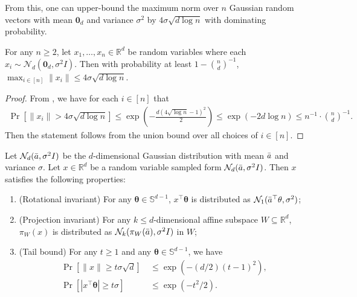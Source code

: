 \documentclass{theoretics}
\newcommand{\R}{\mathbb R}
\newcommand{\E}{\mathbb E}
\begin{document}
From this, one can upper-bound the maximum norm over $n$ Gaussian random vectors with mean $\mathbf{0}_d$ and variance $\sigma^2$ by $4\sigma \sqrt{d \log n}$ with dominating probability.
\begin{corollary}\label{cor:gaussian-globaldiam}
    For any $n \geq 2$,
    let $x_1, \ldots, x_n \in \R^d$ be random variables where each $x_i \sim \mathcal{N}_d(\mathbf{0}_d, \sigma^2 I)$. Then with probability at least $1 - \binom{n}{d}^{-1}$, $\max_{i \in [n]}\|x_i\| \leq 4 \sigma \sqrt{d\log n}$.
\end{corollary}
\begin{proof}
    From , we have for each $i \in [n]$ that
    \begin{align*}
        \Pr[\|x_i\| > 4\sigma \sqrt{d\log n}] \leq \exp(-\frac{d(4\sqrt{\log n} - 1)^2}{2}) \leq \exp(-2d\log n) \leq n^{-1} \cdot \binom{n}{d}^{-1}.
    \end{align*}    
    Then the statement follows from the union bound over all choices of $i \in [n]$.
\end{proof}


\iffalse
\begin{fact}\label{fact:properties-gaussian}
    Let $\mathcal{N}_d(\Bar{a}, \sigma^2I)$ be the $d$-dimensional Gaussian distribution with mean $\Bar{a}$ and variance $\sigma$. Let $x\in \R^d$ be a random variable sampled form $\mathcal{N}_d(\Bar{a}, \sigma^2I)$. Then $x$ satisfies the following properties:
    \begin{enumerate}
        \item {(Rotational invariant)} For any $\mathbf{\theta} \in \mathbb{S}^{d-1}$, $x^\top \mathbf{\theta}$ is distributed as $\mathcal{N}_1(\Bar{a}^\top\mathbf{\theta}, \sigma^2)$; 
        \item {(Projection invariant)} For any $k\leq d$-dimensional affine subspace $W\subseteq \R^d$, $\pi_W(x)$ is distributed as $\mathcal{N}_k(\pi_W(\Bar{a}), \sigma^2 I)$ in $W$;
        \item {(Tail bound)} For any $t\geq 1$ and any $\mathbf{\theta}\in \mathbb{S}^{d-1}$, we have
        \begin{align*}
            \Pr[\|x\| \geq t\sigma \sqrt{d}] & ~ \leq \exp(-(d/2)(t-1)^2), \\
            \Pr[|x^\top \mathbf{\theta}| \geq t\sigma] & ~ \leq \exp(-t^2/2).
        \end{align*}
    \end{enumerate}
\end{fact}
\end{document}
